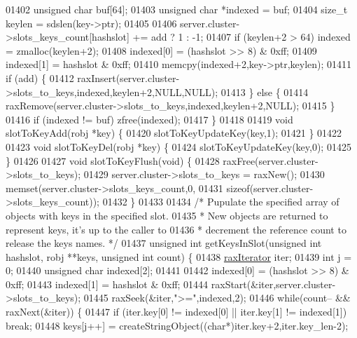\begin{DoxyCode}
01402     \textcolor{keywordtype}{unsigned} \textcolor{keywordtype}{char} buf[64];
01403     \textcolor{keywordtype}{unsigned} \textcolor{keywordtype}{char} *indexed = buf;
01404     size\_t keylen = sdslen(key->ptr);
01405 
01406     server.cluster->slots\_keys\_count[hashslot] += add ? 1 : -1;
01407     \textcolor{keywordflow}{if} (keylen+2 > 64) indexed = zmalloc(keylen+2);
01408     indexed[0] = (hashslot >> 8) & 0xff;
01409     indexed[1] = hashslot & 0xff;
01410     memcpy(indexed+2,key->ptr,keylen);
01411     \textcolor{keywordflow}{if} (add) \{
01412         raxInsert(server.cluster->slots\_to\_keys,indexed,keylen+2,NULL,NULL);
01413     \} \textcolor{keywordflow}{else} \{
01414         raxRemove(server.cluster->slots\_to\_keys,indexed,keylen+2,NULL);
01415     \}
01416     \textcolor{keywordflow}{if} (indexed != buf) zfree(indexed);
01417 \}
01418 
01419 \textcolor{keywordtype}{void} slotToKeyAdd(robj *key) \{
01420     slotToKeyUpdateKey(key,1);
01421 \}
01422 
01423 \textcolor{keywordtype}{void} slotToKeyDel(robj *key) \{
01424     slotToKeyUpdateKey(key,0);
01425 \}
01426 
01427 \textcolor{keywordtype}{void} slotToKeyFlush(\textcolor{keywordtype}{void}) \{
01428     raxFree(server.cluster->slots\_to\_keys);
01429     server.cluster->slots\_to\_keys = raxNew();
01430     memset(server.cluster->slots\_keys\_count,0,
01431            \textcolor{keyword}{sizeof}(server.cluster->slots\_keys\_count));
01432 \}
01433 
01434 \textcolor{comment}{/* Pupulate the specified array of objects with keys in the specified slot.}
01435 \textcolor{comment}{ * New objects are returned to represent keys, it's up to the caller to}
01436 \textcolor{comment}{ * decrement the reference count to release the keys names. */}
01437 \textcolor{keywordtype}{unsigned} \textcolor{keywordtype}{int} getKeysInSlot(\textcolor{keywordtype}{unsigned} \textcolor{keywordtype}{int} hashslot, robj **keys, \textcolor{keywordtype}{unsigned} \textcolor{keywordtype}{int} count) \{
01438     \hyperlink{structraxIterator}{raxIterator} iter;
01439     \textcolor{keywordtype}{int} j = 0;
01440     \textcolor{keywordtype}{unsigned} \textcolor{keywordtype}{char} indexed[2];
01441 
01442     indexed[0] = (hashslot >> 8) & 0xff;
01443     indexed[1] = hashslot & 0xff;
01444     raxStart(&iter,server.cluster->slots\_to\_keys);
01445     raxSeek(&iter,\textcolor{stringliteral}{">="},indexed,2);
01446     \textcolor{keywordflow}{while}(count-- && raxNext(&iter)) \{
01447         \textcolor{keywordflow}{if} (iter.key[0] != indexed[0] || iter.key[1] != indexed[1]) \textcolor{keywordflow}{break};
01448         keys[j++] = createStringObject((\textcolor{keywordtype}{char}*)iter.key+2,iter.key\_len-2);

\end{DoxyCode}

